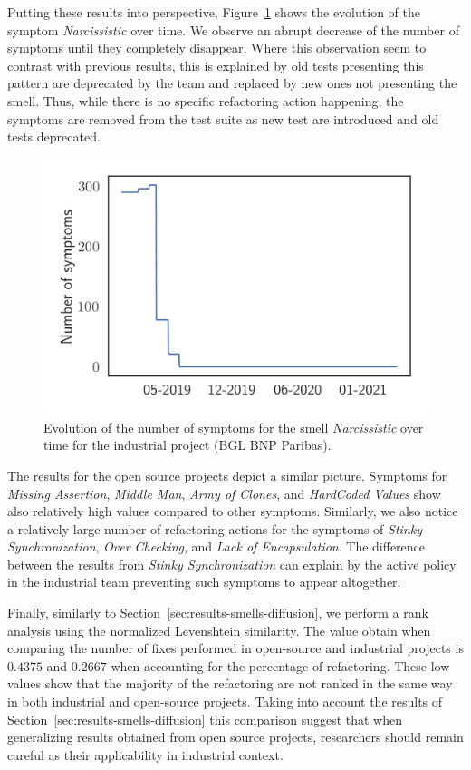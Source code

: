 Putting these results into perspective, Figure~\ref{fig:evolution-bgl-narcissistic} shows the evolution of the symptom \emph{Narcissistic} over time. We observe an abrupt decrease of the number of symptoms until they completely disappear. Where this observation seem to contrast with previous results, this is explained by old tests presenting this pattern are deprecated by the team and replaced by new ones not presenting the smell. Thus, while there is no specific refactoring action happening, the symptoms are removed from the test suite as new test are introduced and old tests deprecated. 

\begin{figure}
\centering
\includegraphics[width=0.5\linewidth]{figures/smells/smell-raw-evolution-bgl-narcissistic.png}
\caption{Evolution of the number of symptoms for the smell \emph{Narcissistic} over time for the industrial project (BGL BNP Paribas).}  
\label{fig:evolution-bgl-narcissistic}
\end{figure} 

The results for the open source projects depict a similar picture. Symptoms for \emph{Missing Assertion}, \emph{Middle Man}, \emph{Army of Clones}, and \emph{HardCoded Values} show also relatively high values compared to other symptoms. Similarly, we also notice a relatively large number of refactoring actions for the symptoms of \emph{Stinky Synchronization}, \emph{Over Checking}, and \emph{Lack of Encapsulation}. The difference between the results from \emph{Stinky Synchronization} can explain by the active policy in the industrial team preventing such symptoms to appear altogether.

Finally, similarly to Section~\ref{sec:results-smells-diffusion}, we perform a rank analysis using the normalized Levenshtein similarity. The value obtain when comparing the number of fixes performed in open-source and industrial projects is $0.4375$ and $0.2667$ when accounting for the percentage of refactoring. These low values show that the majority of the refactoring are not ranked in the same way in both industrial and open-source projects. Taking into account the results of Section~\ref{sec:results-smells-diffusion} this comparison suggest that when generalizing results obtained from open source projects, researchers should remain careful as their applicability in industrial context.

